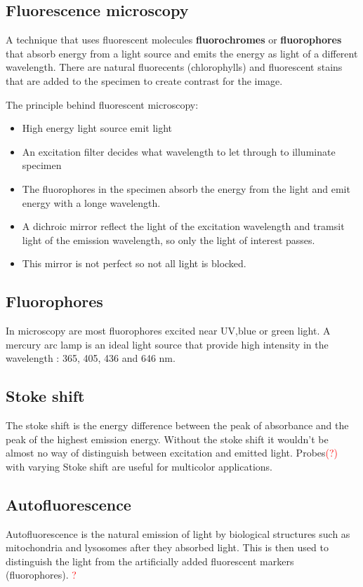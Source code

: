 	 \subsection*{Fluorescence microscopy}
	 A technique that uses fluorescent molecules \textbf{fluorochromes} or \textbf{fluorophores} that absorb energy from a light source and emits the energy as light of a different wavelength. There are natural fluorecents (chlorophylls) and fluorescent stains that are added to the specimen to create contrast for the image.

	 The principle behind fluorescent microscopy: 

	 \begin{itemize}
	 	\item High energy light source emit light 
	 	\item An excitation filter decides what wavelength to let through to illuminate specimen
	 	\item The fluorophores in the specimen absorb the energy from the light and emit energy with a longe wavelength. 
	 	\item A dichroic mirror reflect the light of the excitation wavelength and tramsit light of the emission wavelength, so only the light of interest passes.
	 	\item This mirror is not perfect so not all light is blocked. 
	 \end{itemize}

	 \subsection*{Fluorophores}
	 In microscopy are most fluorophores excited near UV,blue or green light. A mercury arc lamp is an ideal light source that provide high intensity in the wavelength : 365, 405, 436 and 646 nm. 

	 \subsection*{Stoke shift}
	 The stoke shift is the energy difference between the peak of absorbance and the peak of the highest emission energy. Without the stoke shift it wouldn't be almost no way of distinguish between excitation and emitted light. Probes\textcolor{red}{(?)} with varying Stoke shift are useful for multicolor applications. 

	 \subsection*{Autofluorescence}
	 Autofluorescence is the natural emission of light by biological structures such as mitochondria and lysosomes after they absorbed light. This is then used to distinguish the light from the artificially added fluorescent markers (fluorophores). \textcolor{red}{?} 

